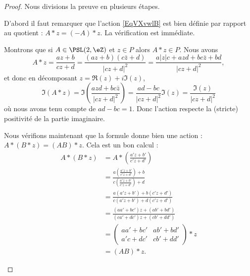 \begin{proof}

	Nous divisions la preuve en plusieurs étapes.
	\begin{subproof}

		D'abord il faut remarquer que l'action \eqref{EqVXvwlB} est bien définie par rapport au quotient : \( A*z=(-A)*z\). La vérification est immédiate.

		\spitem[Interne]

		Montrons que si \( A\in \PSL(2,\eZ)\) et \( z\in P\) alors \( A*z\in P\). Nous avons
		\begin{equation}
			A*z=\frac{ az+b }{ cz+d }=\frac{ (az+b)(c\bar z+d) }{ | cz+d |^2 }=\frac{ a| z |c+azd+bc\bar z+bd }{ | cz+d |^2 },
		\end{equation}
		et donc en décomposant \( z=\Re(z)+i\Im(z)\),
		\begin{equation}
			\Im(A*z)=\Im\left( \frac{ azd+bc\bar z }{ | cz+d |^2 } \right)=\frac{ ad-bc }{ | cz+d |^2 }\Im(z)=\frac{ \Im(z) }{ | cz+d |^2 }
		\end{equation}
		où nous avons tenu compte de \( ad-bc=1\). Donc l'action respecte la (stricte) positivité de la partie imaginaire.

		\spitem[Action]

		Nous vérifions maintenant que la formule donne bien une action : \( A*(B*z)=(AB)*z\). Cela est un bon calcul :
		\begin{subequations}
			\begin{align}
				A*(B*z) & =A*\left( \frac{ a'z+b' }{ c'z+d' } \right)                                                          \\
				        & =\frac{ a\left( \frac{ a'z+b' }{ c'z+d' } \right)+b }{ c\left( \frac{ a'z+b' }{ c'z+d' } \right)+d } \\
				        & =\frac{ a(a'z+b')+b(c'z+d') }{ c(a'z+b')+d(c'z+d') }                                                 \\
				        & =\frac{ (aa'+bc')z+(ab'+bd') }{ (ca'+dc')z+(cb'+dd') }                                               \\
				        & =\begin{pmatrix}
					           aa'+bc' & ab'+bd' \\
					           a'c+dc' & cb'+dd'
				           \end{pmatrix}*z                                                                                   \\
				        & =(AB)*z.
			\end{align}
		\end{subequations}
		\spitem[Fidèle]


\end{subproof}
\end{proof}

